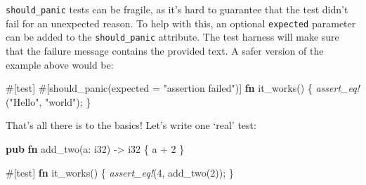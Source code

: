 \documentclass[a4paper,]{book}
\newenvironment{Shaded}{\begin{snugshade}}{\end{snugshade}}
\newcommand{\KeywordTok}[1]{\textcolor[rgb]{0.13,0.29,0.53}{\textbf{{#1}}}}
\newcommand{\DataTypeTok}[1]{\textcolor[rgb]{0.13,0.29,0.53}{{#1}}}
\newcommand{\DecValTok}[1]{\textcolor[rgb]{0.00,0.00,0.81}{{#1}}}
\newcommand{\StringTok}[1]{\textcolor[rgb]{0.31,0.60,0.02}{{#1}}}
\newcommand{\PreprocessorTok}[1]{\textcolor[rgb]{0.56,0.35,0.01}{\textit{{#1}}}}
\newcommand{\AttributeTok}[1]{\textcolor[rgb]{0.77,0.63,0.00}{{#1}}}
\newcommand{\NormalTok}[1]{{#1}}
\begin{document}
\begin{Shaded}
\end{Shaded}

\texttt{should\_panic} tests can be fragile, as it's hard to guarantee
that the test didn't fail for an unexpected reason. To help with this,
an optional \texttt{expected} parameter can be added to the
\texttt{should\_panic} attribute. The test harness will make sure that
the failure message contains the provided text. A safer version of the
example above would be:

\begin{Shaded}
\begin{Highlighting}[]
\AttributeTok{#[}\NormalTok{test}\AttributeTok{]}
\AttributeTok{#[}\NormalTok{should_panic}\AttributeTok{(}\NormalTok{expected }\AttributeTok{=} \StringTok{"assertion failed"}\AttributeTok{)]}
\KeywordTok{fn} \NormalTok{it_works() \{}
    \PreprocessorTok{assert_eq!}\NormalTok{(}\StringTok{"Hello"}\NormalTok{, }\StringTok{"world"}\NormalTok{);}
\NormalTok{\}}
\end{Highlighting}
\end{Shaded}

That's all there is to the basics! Let's write one `real' test:

\begin{Shaded}
\begin{Highlighting}[]
\KeywordTok{pub} \KeywordTok{fn} \NormalTok{add_two(a: }\DataTypeTok{i32}\NormalTok{) -> }\DataTypeTok{i32} \NormalTok{\{}
    \NormalTok{a + }\DecValTok{2}
\NormalTok{\}}

\AttributeTok{#[}\NormalTok{test}\AttributeTok{]}
\KeywordTok{fn} \NormalTok{it_works() \{}
    \PreprocessorTok{assert_eq!}\NormalTok{(}\DecValTok{4}\NormalTok{, add_two(}\DecValTok{2}\NormalTok{));}
\NormalTok{\}}
\end{Highlighting}
\end{Shaded}
\end{document}
